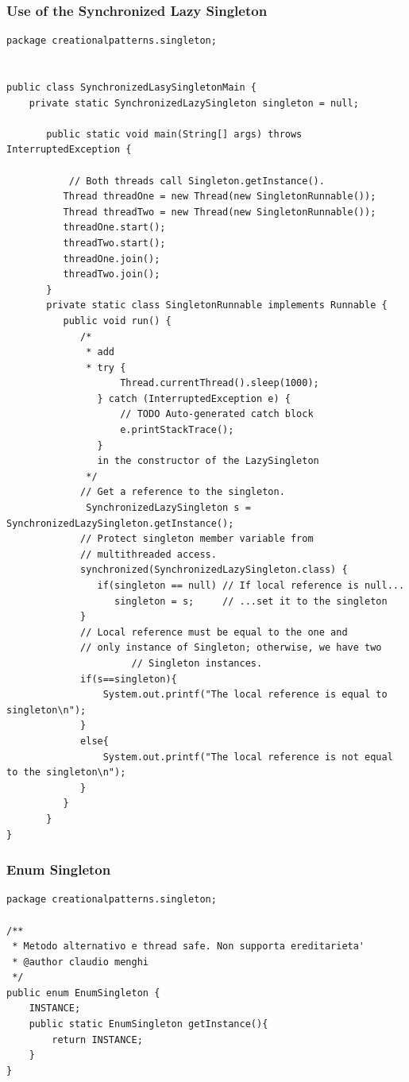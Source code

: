 \documentclass{article}
\begin{document}
\subsubsection{Use of the Synchronized Lazy Singleton}
\begin{lstlisting}
package creationalpatterns.singleton;


public class SynchronizedLasySingletonMain {
	private static SynchronizedLazySingleton singleton = null;
	
	   public static void main(String[] args) throws InterruptedException {
			
		   // Both threads call Singleton.getInstance().
	      Thread threadOne = new Thread(new SingletonRunnable());
	      Thread threadTwo = new Thread(new SingletonRunnable());
	      threadOne.start();
	      threadTwo.start();
	      threadOne.join();
	      threadTwo.join();
	   }
	   private static class SingletonRunnable implements Runnable {
	      public void run() {
	    	 /*
	    	  * add 
	    	  * try {
					Thread.currentThread().sleep(1000);
				} catch (InterruptedException e) {
					// TODO Auto-generated catch block
					e.printStackTrace();
				}
				in the constructor of the LazySingleton 
	    	  */
	         // Get a reference to the singleton.
	    	  SynchronizedLazySingleton s = SynchronizedLazySingleton.getInstance();
	         // Protect singleton member variable from
	         // multithreaded access.
	         synchronized(SynchronizedLazySingleton.class) {
	            if(singleton == null) // If local reference is null...
	               singleton = s;     // ...set it to the singleton
	         }
	         // Local reference must be equal to the one and
	         // only instance of Singleton; otherwise, we have two
	                  // Singleton instances.
	         if(s==singleton){
	        	 System.out.printf("The local reference is equal to singleton\n");
	         }
	         else{
	        	 System.out.printf("The local reference is not equal to the singleton\n");
	         }
	      }
	   }
}
\end{lstlisting}


\subsubsection{Enum Singleton}

\begin{lstlisting}
package creationalpatterns.singleton;

/**
 * Metodo alternativo e thread safe. Non supporta ereditarieta'
 * @author claudio menghi
 */
public enum EnumSingleton {
	INSTANCE;
	public static EnumSingleton getInstance(){
		return INSTANCE;
	}
}
\end{lstlisting}
\end{document}

